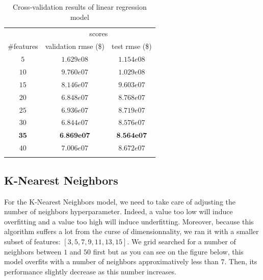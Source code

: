 \begin{table}[H]
	\centering
	\begin{tabular}{ccc} \toprule
	  & \multicolumn {2}{c}{scores} \\\cmidrule(lr) {2-3}
	  \#features         & validation rmse (\$)             & test rmse (\$) \\\hline
	  $5$        		& $1.629e08$                      	& $1.154e08$ \\
	  $10$        		& $9.760e07$                        & $1.029e08$ \\
	  $15$        		& $8.146e07$                        & $9.603e07$ \\
	  $20$             	& $6.848e07$                        & $8.768e07$ \\
	  $25$             	& $6.936e07$                        & $8.719e07$ \\
	  $30$     			& $6.844e07$              		    & $8.576e07$ \\
	  $\textbf{35}$     & $\textbf{6.869e07}$               & $\textbf{8.564e07}$ \\
	  $40$             	& $7.006e07$                        & $8.672e07$ \\
	  \\\hline
	\end{tabular}
	\caption{Cross-validation results of linear regression model}
	\label{tab:linear-regression-results}
\end{table}

\subsection{K-Nearest Neighbors}

For the K-Nearest Neighbors model, we need to take care of adjusting the number of neighbors hyperparameter. Indeed, a value too low will induce overfitting and a value too high will induce underfitting. Moreover, because this algorithm suffers a lot from the curse of dimensionnality, we ran it with a smaller subset of features: $[3,5,7,9,11,13,15]$. We grid searched for a number of neighbors between $1$ and $50$ first but as you can see on the figure below, this model overfits with a number of neighbors approximatively less than $7$. Then, its performance slightly decrease as this number increases.

